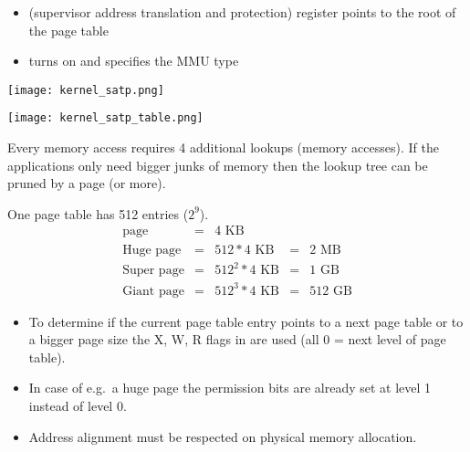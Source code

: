 \newpar{}
\begin{itemize}
    \item {} (supervisor address translation and protection) register points to the root of the page table
    \item {} turns on and specifies the MMU type
\end{itemize}
\begin{center}
    \texttt{[image: kernel\_satp.png]}
\end{center}
\begin{center}
    \texttt{[image: kernel\_satp\_table.png]}
\end{center}

\newpar{}

Every memory access requires 4 additional lookups (memory accesses). If the applications only need bigger junks of memory then the lookup tree can be pruned by a page (or more).

\newpar{}
One page table has 512 entries ($2^9$).
\begin{align*}
    \text{page}       & = & 4\text{~KB}         &   &               \\
    \text{Huge page}  & = & 512 * 4\text{~KB}   & = & 2\text{~MB}   \\
    \text{Super page} & = & 512^2 * 4\text{~KB} & = & 1\text{~GB}   \\
    \text{Giant page} & = & 512^3 * 4\text{~KB} & = & 512\text{~GB}
\end{align*}

\begin{itemize}
    \item To determine if the current page table entry points to a next page table or to a bigger page size the X, W, R flags in are used (all 0 = next level of page table).
    \item In case of e.g.\ a huge page the permission bits are already set at level 1 instead of level 0.
    \item Address alignment must be respected on physical memory allocation.
\end{itemize}

